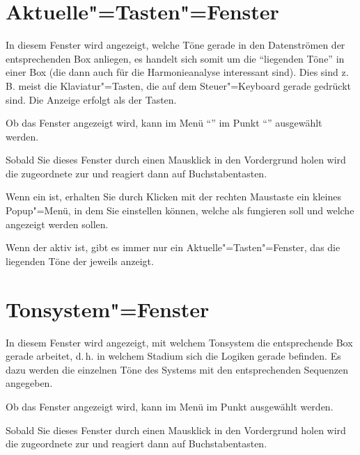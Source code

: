 \section{Aktuelle"=Tasten"=Fenster}\label{sec:DE_KEY}
In diesem Fenster wird angezeigt, welche Töne gerade in den
Datenströmen der entsprechenden Box anliegen, es handelt sich somit um
die "`liegenden Töne"' in einer Box (die dann auch für die
Harmonieanalyse interessant sind). Dies sind z.\,B. meist die
Klaviatur"=Tasten, die auf dem Steuer"=Keyboard gerade gedrückt sind.
Die Anzeige erfolgt als  der
Tasten.


Ob das Fenster angezeigt wird, kann im Menü
"`"' im Punkt
"`"' ausgewählt werden.

Sobald Sie dieses Fenster durch einen Mausklick in den Vordergrund
holen wird die zugeordnete  zur
 und reagiert dann auf
Buchstabentasten.


Wenn ein 
 ist, erhalten Sie durch Klicken
mit der rechten Maustaste ein kleines Popup"=Menü, in dem Sie
einstellen können, welche  als
 fungieren soll und welche
 angezeigt werden sollen.


Wenn der  aktiv ist, gibt es immer 
nur ein Aktuelle"=Tasten"=Fenster, das die liegenden Töne der 
jeweils  anzeigt.



\section{Tonsystem"=Fenster}\label{sec:DE_TS}
In diesem Fenster wird angezeigt, mit welchem Tonsystem die
entsprechende Box gerade arbeitet, d.\,h. in welchem Stadium sich die
Logiken gerade befinden. Es dazu werden die einzelnen Töne des Systems
mit den entsprechenden Sequenzen angegeben.


Ob das Fenster angezeigt wird, kann im Menü  
im Punkt  ausgewählt werden.


Sobald Sie dieses Fenster durch einen Mausklick in den Vordergrund
holen wird die zugeordnete  zur
 und reagiert dann auf
Buchstabentasten.


